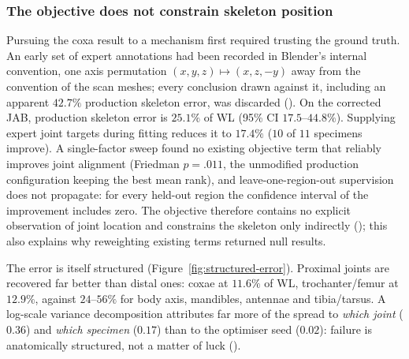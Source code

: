 \subsubsection{The objective does not constrain skeleton position}
\label{sec:skeleton-underdetermined}

Pursuing the coxa result to a mechanism first required trusting the ground
truth. An early set of expert annotations had been recorded in Blender's
internal convention, one axis permutation $(x,y,z)\mapsto(x,z,-y)$ away from
the convention of the scan meshes; every conclusion drawn against it, including
an apparent $42.7\%$ production skeleton error, was discarded (). On the
corrected JAB, production skeleton error is $25.1\%$ of WL (95\% CI
$17.5$--$44.8\%$). Supplying expert joint targets during fitting reduces it to
$17.4\%$ ($10$ of $11$ specimens improve). A single-factor sweep found no
existing objective term that reliably improves joint alignment (Friedman
$p=.011$, the unmodified production configuration keeping the best mean rank),
and leave-one-region-out supervision does not propagate: for every held-out
region the confidence interval of the improvement includes zero. The objective
therefore contains no explicit observation of joint location and constrains
the skeleton only indirectly (); this also explains why reweighting
existing terms returned null results.

The error is itself structured (Figure~\ref{fig:structured-error}). Proximal
joints are recovered far better than distal ones: coxae at $11.6\%$ of WL,
trochanter/femur at $12.9\%$, against $24$--$56\%$ for body axis, mandibles,
antennae and tibia/tarsus. A log-scale variance decomposition attributes far
more of the spread to \emph{which joint} ($0.36$) and \emph{which specimen}
($0.17$) than to the optimiser seed ($0.02$): failure is anatomically
structured, not a matter of luck ().

